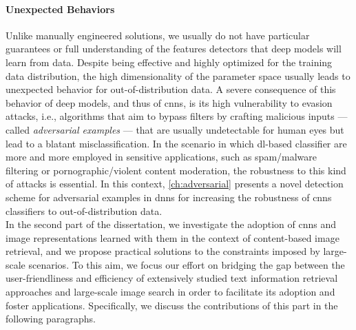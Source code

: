 \paragraph{Unexpected Behaviors}
Unlike manually engineered solutions, we usually do not have particular guarantees or full understanding of the features detectors that deep models will learn from data.
Despite being effective and highly optimized for the training data distribution, the high dimensionality of the parameter space usually leads to unexpected behavior for out-of-distribution data.
A severe consequence of this behavior of deep models, and thus of \glspl{cnn}, is its high vulnerability to evasion attacks, i.e., algorithms that aim to bypass filters by crafting malicious inputs --- called \emph{adversarial examples} --- that are usually undetectable for human eyes but lead to a blatant misclassification.
In the scenario in which \gls{dl}-based classifier are more and more employed in sensitive applications, such as spam/malware filtering or pornographic/violent content moderation, the robustness to this kind of attacks is essential.
In this context, \ref{ch:adversarial} presents a novel detection scheme for adversarial examples in \glspl{dnn} for increasing the robustness of \glspl{cnn} classifiers to out-of-distribution data.\\

In the second part of the dissertation, we investigate the adoption of \glspl{cnn} and image representations learned with them in the context of content-based image retrieval, and we propose practical solutions to the constraints imposed by large-scale scenarios.
To this aim, we focus our effort on bridging the gap between the user-friendliness and efficiency of extensively studied text information retrieval approaches and large-scale image search in order to facilitate its adoption and foster applications.
Specifically, we discuss the contributions of this part in the following paragraphs.

